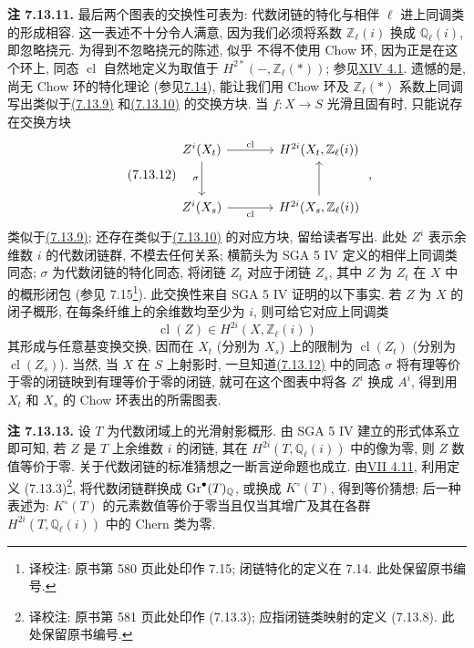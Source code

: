 \textbf{注 7.13.11.} 最后两个图表的交换性可表为: 代数闭链的特化与相伴 $\ell$ 进上同调类的形成相容. 这一表述不十分令人满意, 因为我们必须将系数 $\mathbb Z_\ell(i)$ 换成 $\mathbb Q_\ell(i)$, 即忽略挠元. 为得到不忽略挠元的陈述, 似乎
%
%
%
%
%
%
不得不使用 Chow 环, 因为正是在这个环上, 同态 $\operatorname{cl}$ 自然地定义为取值于 $H^{2*}(-,\mathbb Z_\ell(*))$; 参见\hyperlink{sga6.e14.para.4-1}{XIV 4.1}. 遗憾的是, 尚无 Chow 环的特化理论 (参见\hyperlink{sga6.e10.sec.7.14}{7.14}), 能让我们用 Chow 环及 $\mathbb Z_\ell(*)$ 系数上同调写出类似于\hyperlink{sga6.e10.eq.7-13-9}{(7.13.9)} 和\hyperlink{sga6.e10.eq.7-13-10}{(7.13.10)} 的交换方块. 当 $f:X\to S$ 光滑且固有时, 只能说存在交换方块
%
%
%
%
%
%
%
\begin{equation}\tag{7.13.12}
\begin{tikzcd}[column sep=large,row sep=large]
Z^i(X_t) \arrow[r,"\operatorname{cl}"] \arrow[d,"\sigma"'] &
H^{2i}(X_t,\mathbb Z_\ell(i))\\
Z^i(X_s) \arrow[r,"\operatorname{cl}"'] &
H^{2i}(X_s,\mathbb Z_\ell(i)) \arrow[u]
\end{tikzcd}
\;,
\end{equation}
类似于\hyperlink{sga6.e10.eq.7-13-9}{(7.13.9)}; 还存在类似于\hyperlink{sga6.e10.eq.7-13-10}{(7.13.10)} 的对应方块, 留给读者写出. 此处 $Z^i$ 表示余维数 $i$ 的代数闭链群, 不模去任何关系; 横箭头为 SGA 5 IV 定义的相伴上同调类同态; $\sigma$ 为代数闭链的特化同态, 将闭链 $Z_t$ 对应于闭链 $Z_s$, 其中 $Z$ 为 $Z_t$ 在 $X$ 中的概形闭包 (参见 7.15\footnote{译校注: 原书第 580 页此处印作 7.15; 闭链特化的定义在 7.14. 此处保留原书编号.}). 此交换性来自 SGA 5 IV 证明的以下事实. 若 $Z$ 为 $X$ 的闭子概形, 在每条纤维上的余维数均至少为 $i$, 则可给它对应上同调类
%
%
%
%
%
%
%
%
%
\[
\operatorname{cl}(Z)\in H^{2i}(X,\mathbb Z_\ell(i))
\]
其形成与任意基变换交换, 因而在 $X_t$ (分别为 $X_s$) 上的限制为 $\operatorname{cl}(Z_t)$ (分别为 $\operatorname{cl}(Z_s)$). 当然, 当 $X$ 在 $S$ 上射影时, 一旦知道\hyperlink{sga6.e10.eq.7-13-12}{(7.13.12)} 中的同态 $\sigma$ 将有理等价于零的闭链映到有理等价于零的闭链,
%
%
%
%
%
就可在这个图表中将各 $Z^i$ 换成 $A^i$, 得到用 $X_t$ 和 $X_s$ 的 Chow 环表出的所需图表.
%

\textbf{注 7.13.13.} 设 $T$ 为代数闭域上的光滑射影概形. 由 SGA 5 IV 建立的形式体系立即可知, 若 $Z$ 是 $T$ 上余维数 $i$ 的闭链, 其在 $H^{2i}(T,\mathbb Q_\ell(i))$ 中的像为零, 则 $Z$ 数值等价于零. 关于代数闭链的标准猜想之一断言逆命题也成立. 由\hyperlink{sga6.e07.prop.4-11}{VII 4.11}, 利用定义 (7.13.3)\footnote{译校注: 原书第 581 页此处印作 (7.13.3); 应指闭链类映射的定义 (7.13.8). 此处保留原书编号.}, 将代数闭链群换成 $\operatorname{Gr}^\bullet(T)_{\mathbb Q}$, 或换成 $K^\circ(T)$, 得到等价猜想; 后一种表述为: $K^\circ(T)$ 的元素数值等价于零当且仅当其增广及其在各群 $H^{2i}(T,\mathbb Q_\ell(i))$ 中的 Chern 类为零.
%
%
%
%
%
%
%
%
%
%
%

